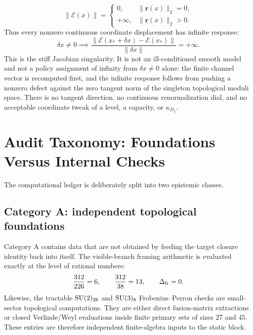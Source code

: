 \documentclass[11pt]{article}
\newcommand{\SU}{\mathrm{SU}}
\newcommand{\Eclosure}{\mathcal{E}}
\begin{document}
\begin{equation}
  \|\Eclosure(x)\|=
  \begin{cases}
    0, & \|\mathbf{r}(x)\|_2=0,\\
    +\infty, & \|\mathbf{r}(x)\|_2>0.
  \end{cases}
  \label{eq:closure-norm}
\end{equation}
Thus every nonzero continuous coordinate displacement has infinite response:
\begin{equation}
  \boxed{
  \delta x \neq 0
  \implies
  \frac{\|\Eclosure(x_*+\delta x)-\Eclosure(x_*)\|}{\|\delta x\|}=+\infty.
  }
  \label{eq:infinite-derivative}
\end{equation}
This is the stiff Jacobian singularity.  It is not an ill-conditioned smooth model and not a policy assignment of infinity from \(\delta x\neq0\) alone: the finite channel vector is recomputed first, and the infinite response follows from pushing a nonzero defect against the zero tangent norm of the singleton topological moduli space.  There is no tangent direction, no continuous renormalization dial, and no acceptable coordinate tweak of a level, a capacity, or \(\kappa_{D_5}\).

\section{Audit Taxonomy: Foundations Versus Internal Checks}

The computational ledger is deliberately split into two epistemic classes.

\subsection{Category A: independent topological foundations}

Category A contains data that are not obtained by feeding the target closure identity back into itself.  The visible-branch framing arithmetic is evaluated exactly at the level of rational numbers:
\begin{equation}
  \frac{312}{226}=6,
  \qquad
  \frac{312}{38}=13,
  \qquad
  \Delta_{\mathrm{fr}}=0.
\end{equation}
Likewise, the tractable \(\SU(2)_{\benchmarkLeptonLevel}\) and \(\SU(3)_{\benchmarkQuarkLevel}\) Frobenius--Perron checks are small-sector topological computations.  They are either direct fusion-matrix extractions or closed Verlinde/Weyl evaluations inside finite primary sets of sizes \(27\) and \(45\).  These entries are therefore independent finite-algebra inputs to the static block.
\end{document}
